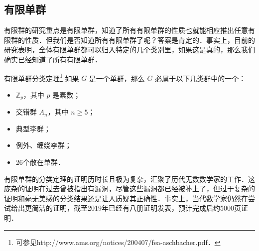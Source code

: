 \subsection{有限单群}

有限群的研究重点是有限单群，知道了所有有限单群的性质也就能相应推出任意有限群的性质．但我们是否知道所有有限单群了呢？答案是肯定的．事实上，目前的研究表明，全体有限单群都可以归入特定的几个类别里，如果这是真的，那么我们确实已经知道了所有有限单群．

\begin{definition}{有限单群分类定理\footnote{可参见http://www.ams.org/notices/200407/fea-aschbacher.pdf．}}
如果 $G$ 是一个单群，那么 $G$ 必属于以下几类群中的一个：
\begin{itemize}
\item $\mathbb{Z}_p$，其中 $p$ 是素数；
\item 交错群 $A_n$，其中 $n\geq 5$；
\item 典型李群；
\item 例外、缠绕李群；
\item 26个散在单群．
\end{itemize}
\end{definition}

有限单群的分类定理的证明历时长且极为复杂，汇聚了历代无数数学家的工作．这庞杂的证明在过去曾被指出有漏洞，尽管这些漏洞都已经被补上了，但过于复杂的证明和毫无美感的分类结果还是让人质疑其正确性．事实上，当代数学家仍然在尝试给出更简洁的证明，截至2019年已经有八册证明发表，预计完成后约5000页证明．












